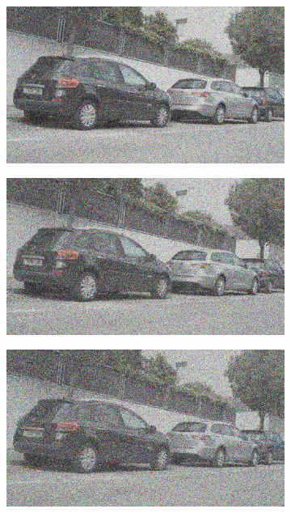 \documentclass[a4paper]{ctexart}
\begin{document}
\begin{figure}[htbp]
\begin{subfigure}{0.08\textwidth}
			\label{fig：Gamma=1.0, Gauss Noise = 0.4}
		\end{subfigure}
		\begin{subfigure}{0.08\textwidth}
			\captionsetup{font=scriptsize}
			\includegraphics[width=\linewidth]{picture/Edge Detection/degrade/RGB_001 Gamma=1.0, Gauss Noise=0.5}
			\label{fig：Gamma=1.0, Gauss Noise = 0.5}
		\end{subfigure}
		\begin{subfigure}{0.08\textwidth}
			\captionsetup{font=scriptsize}
			\includegraphics[width=\linewidth]{picture/Edge Detection/degrade/RGB_001 Gamma=1.0, Gauss Noise=0.6}
			\label{fig：Gamma=1.0, Gauss Noise = 0.6}
		\end{subfigure}
		\begin{subfigure}{0.08\textwidth}
			\captionsetup{font=scriptsize}
			\includegraphics[width=\linewidth]{picture/Edge Detection/degrade/RGB_001 Gamma=1.0, Gauss Noise=0.7}

\end{subfigure}
\end{figure}
\end{document}
